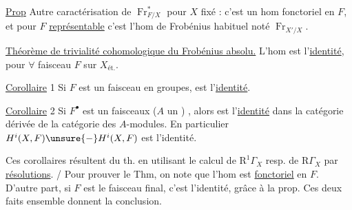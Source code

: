 \uline{Prop} Autre caractérisation de $\operatorname{Fr}_{F/X}^*$ pour $X$ fixé : c'est un hom fonctoriel en $F$, et pour $F$ \uline{représentable}  c'est l'hom de Frobénius habituel noté $\operatorname{Fr}_{X'/X}$.

\uline{Théorème de trivialité cohomologique du Frobénius absolu.}
L'hom
est l'\uline{identité}, pour $\forall$ faisceau $F$ sur $X_{\text{ét.}}$.

\uline{Corollaire} 1 Si $F$ est un faisceau en groupes,
est l'\uline{identité}.

\uline{Corollaire} 2 Si $F^\bullet$ est un  faisceaux   ($A$ un  ) , alors
est l'\uline{identité} dans la catégorie  dérivée de la catégorie des $A$-modules.
En particulier $H^i(X,F)\unsure{\mathbin{-}}H^i(X,F)$ est l'identité.

Ces corollaires résultent du th. en utilisant le calcul de $\mathrm R^1\Gamma_X$ resp. de $\mathrm R\Gamma_X$ par \uline{résolutions}. / Pour prouver le Thm, on note que   l'hom
est \uline{fonctoriel} en $F$. D'autre part, si $F$ est le faisceau final, c'est l'identité, grâce à la prop. Ces deux faits ensemble donnent  la conclusion.

